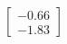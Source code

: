 \documentclass[preview]{standalone}
\begin{document}
\begin{align*}
\begin{bmatrix} -0.66 \\ -1.83 \end{bmatrix}
\end{align*}
\end{document}
